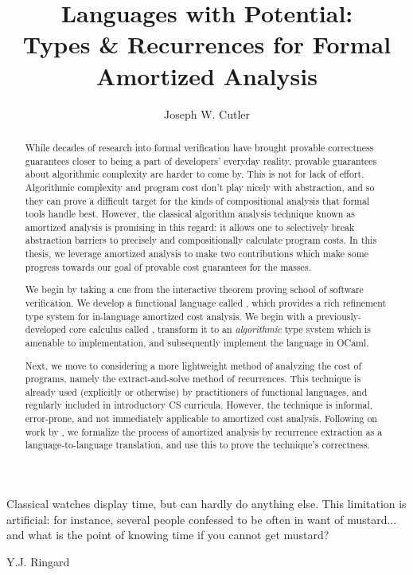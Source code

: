 \documentclass[final]{westhesis}
\title{Languages with Potential:\\
\normalsize{Types \& Recurrences for Formal Amortized Analysis}}
\author{Joseph W. Cutler}
\begin{document}
\begin{abstract}
While decades of research into formal verification have brought provable correctness guarantees closer to being a part of developers' everyday reality, provable guarantees about algorithmic complexity are harder to come by. This is not for lack of effort. Algorithmic complexity and program cost don't play nicely with abstraction, and so they can prove a difficult target for the kinds of compositional analysis that formal tools handle best. However, the classical algorithm analysis technique known as amortized analysis \cite{tarjan:amortized-complexity} is promising in this regard: it allows one to selectively break abstraction barriers to precisely and compositionally calculate program costs. In this thesis, we leverage amortized analysis to make two contributions which make some progress towards our goal of provable cost guarantees for the masses.

We begin by taking a cue from the interactive theorem proving school of software verification. We develop a functional language called \lambdaamorimpl, which provides a rich refinement type system for in-language amortized cost analysis. We begin with a previously-developed core calculus called \lambdaamor \cite{rajani-et-al:popl21}, transform it to an \textit{algorithmic} type system which is amenable to implementation, and subsequently implement the language in OCaml.

Next, we move to considering a more lightweight method of analyzing the cost of programs, namely the extract-and-solve method of recurrences. This technique is already used (explicitly or otherwise) by practitioners of functional languages, and regularly included in introductory CS curricula. However, the technique is informal, error-prone, and not immediately applicable to amortized cost analysis. Following on work by \citet{danner-et-al:icfp15}, we formalize the process of amortized analysis by recurrence extraction as a language-to-language translation, and use this to prove the technique's correctness.
\end{abstract}


\begin{dedication}
\epigraph{Classical watches display time, but can hardly do anything else. This limitation is artificial: for instance, several people confessed to be often in want of mustard... and what is the point of knowing time if you cannot get mustard?}{Y.J. Ringard \cite{mustard-watches}}
\end{dedication}
\end{document}

